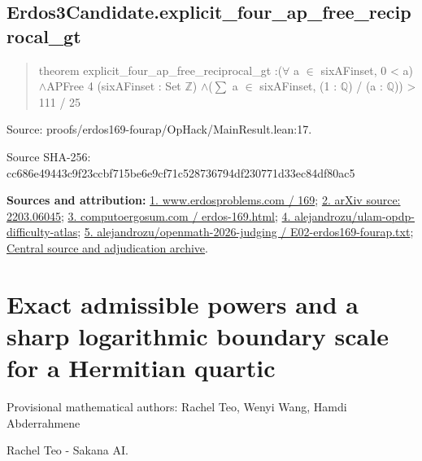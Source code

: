 \documentclass[11pt,a4paper]{article}
\begin{document}
\begin{samepage}
\subsection{Erdos3Candidate.explicit\_four\_ap\_free\_reciprocal\_gt}
\begin{quote}\small\ttfamily theorem explicit\_four\_ap\_free\_reciprocal\_gt :\newline     (\ensuremath{\forall} a \ensuremath{\in} sixAFinset, 0 < a) \ensuremath{\wedge}\newline       APFree 4 (sixAFinset : Set \ensuremath{\mathbb{Z}}) \ensuremath{\wedge}\newline       (\ensuremath{\sum} a \ensuremath{\in} sixAFinset, (1 : \ensuremath{\mathbb{Q}}) / (a : \ensuremath{\mathbb{Q}})) > 111 / 25\end{quote}
{\small Source: proofs/erdos169-fourap/OpHack/MainResult.lean:17.\par}

{\small Source SHA-256: cc686e49443c9f23ccbf715be6e9cf71c528736794df230771d33ec84df80ac5\par}

{\small\textbf{Sources and attribution:} \href{https://www.erdosproblems.com/169}{1. www.erdosproblems.com / 169}; \href{https://arxiv.org/abs/2203.06045}{2. arXiv source: 2203.06045}; \href{https://computoergosum.com/en/principia/erdos-169.html}{3. computoergosum.com / erdos-169.html}; \href{https://github.com/alejandrozu/ulam-opdp-difficulty-atlas}{4. alejandrozu/ulam-opdp-difficulty-atlas}; \href{https://github.com/alejandrozu/openmath-2026-judging/blob/d0ed487f487fa7ec814ff705ab55249983fe8707/OpenMath-Judging/review/entries/E02-erdos169-fourap.txt}{5. alejandrozu/openmath-2026-judging / E02-erdos169-fourap.txt}; \href{https://github.com/alejandrozu/openmath-2026-judging}{Central source and adjudication archive}.\par}

\end{samepage}
\clearpage
\section{Exact admissible powers and a sharp logarithmic boundary scale for a Hermitian quartic}
{\small Provisional mathematical authors: Rachel Teo, Wenyi Wang, Hamdi Abderrahmene\par}\medskip
{\small Rachel Teo  -  Sakana AI.\par}
\end{document}
